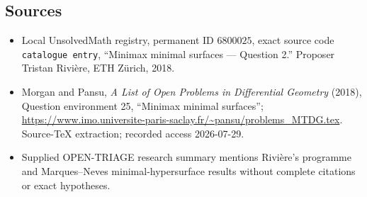 \documentclass[11pt]{article}
\begin{document}
\subsection{Sources}
\begin{itemize}
\item Local UnsolvedMath registry, permanent ID \(6800025\), exact source code \texttt{catalogue entry}, ``Minimax minimal surfaces --- Question 2.'' Proposer Tristan Rivière, ETH Zürich, 2018.
\item Morgan and Pansu, \emph{A List of Open Problems in Differential Geometry} (2018), Question environment 25, ``Minimax minimal surfaces''; \url{https://www.imo.universite-paris-saclay.fr/~pansu/problems_MTDG.tex}. Source-TeX extraction; recorded access 2026-07-29.
\item Supplied OPEN-TRIAGE research summary mentions Rivière's programme and Marques--Neves minimal-hypersurface results without complete citations or exact hypotheses.
\end{itemize}
\end{document}
